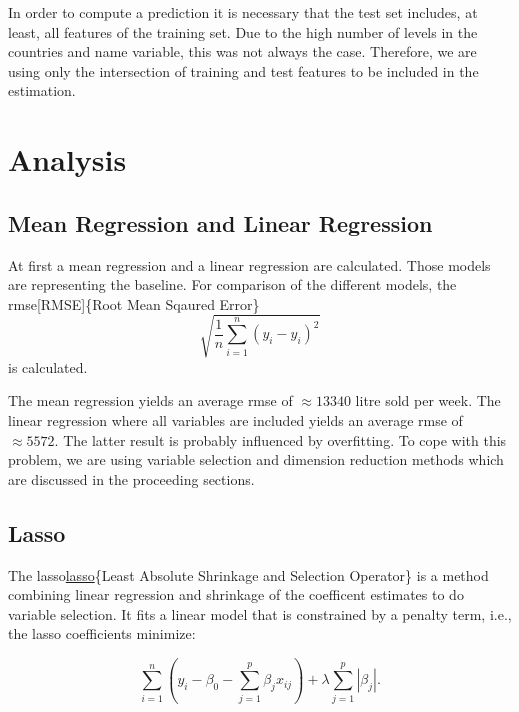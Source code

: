 \documentclass[11pt,]{article}
\begin{document}
In order to compute a prediction it is necessary that the test set
includes, at least, all features of the training set. Due to the high
number of levels in the countries and name variable, this was not always
the case. Therefore, we are using only the intersection of training and
test features to be included in the estimation.

\hypertarget{analysis}{%
\section{Analysis}\label{analysis}}

\hypertarget{mean-regression-and-linear-regression}{%
\subsection{Mean Regression and Linear
Regression}\label{mean-regression-and-linear-regression}}

At first a mean regression and a linear regression are calculated. Those
models are representing the baseline. For comparison of the different
models, the \ac{rmse}{[}RMSE{]}\{Root Mean Sqaured Error\}
\[\sqrt{\frac{1}{n}\sum_{i = 1}^{n}\left(y_i-\hat{y}_i\right)^2}\] is
calculated.

The mean regression yields an average \ac{rmse} of \(\approx 13340\)
litre sold per week. The linear regression where all variables are
included yields an average \ac{rmse} of \(\approx 5572\). The latter
result is probably influenced by overfitting. To cope with this problem,
we are using variable selection and dimension reduction methods which
are discussed in the proceeding sections.

\hypertarget{lasso}{%
\subsection{Lasso}\label{lasso}}

The \ac{lasso}\protect\hyperlink{lasso}{lasso}\{Least Absolute Shrinkage
and Selection Operator\} is a method combining linear regression and
shrinkage of the coefficent estimates to do variable selection. It fits
a linear model that is constrained by a penalty term, i.e., the
\ac{lasso} coefficients minimize:

\[
\sum_{i=1}^{n}(y_i - \beta_0 - \sum_{j=1}^{p}\beta_jx_{ij})+\lambda\sum_{j=1}^{p}|\beta_j|.
\]
\end{document}
